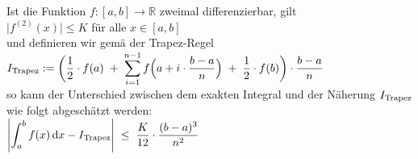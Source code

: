 \begin{Satz}
  Ist die Funktion $f:[a,b]\rightarrow \mathbb{R}$ zweimal differenzierbar, gilt
  \\[0.2cm]
  \hspace*{1.3cm}
  $\bigl|f^{(2)}(x)\bigr| \leq K$ \quad f\"ur alle $x\in[a,b]$
  \\[0.2cm]
  und definieren wir gem\"a\3 der Trapez-Regel 
  \\[0.2cm]
  \hspace*{1.3cm}
  $\displaystyle I_{\mbox{\scriptsize Trapez}} := \biggl(\frac{1}{2}\cdot f(a) \;+\; \sum\limits_{i=1}^{n-1} f\Bigl(a+i\cdot \frac{b-a}{n}\Bigr)\;+\;\frac{1}{2}\cdot f(b)\biggr) \cdot  \frac{b-a}{n}$
  \\[0.2cm]
  so kann der Unterschied zwischen dem exakten Integral und der N\"aherung $I_{\mbox{\scriptsize Trapez}}$
  wie folgt abgesch\"atzt werden:
  \\[0.2cm]
  \hspace*{1.3cm}
  $\displaystyle \left| \int_a^b f(x)\,\textrm{d} x - I_{\mbox{\scriptsize Trapez}} \right| \;\leq\; 
   \frac{K}{12}\cdot  \frac{(b-a)^3}{n^2}$
\end{Satz}

